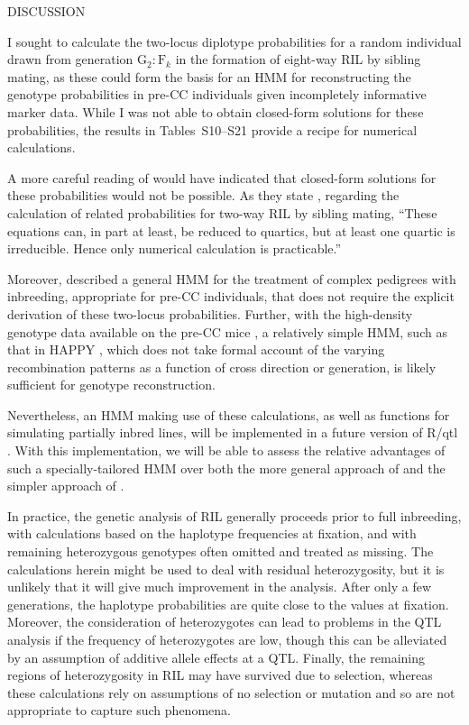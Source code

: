 \documentclass[12pt,letterpaper]{article}
\begin{document}
\clearpage
\centerline{DISCUSSION}


I sought to calculate the two-locus diplotype probabilities for a
random individual drawn from generation $\text{G}_2:\text{F}_k$ in the
formation of eight-way RIL by sibling mating, as these could form the
basis for an HMM for reconstructing the 
genotype probabilities in pre-CC individuals given incompletely
informative marker data.  While I was not able to obtain closed-form
solutions for these probabilities, the results in Tables~S10--S21
provide a recipe for numerical calculations.  


A more careful reading of \citet{Haldane1931} would have indicated
that closed-form solutions for these probabilities would not be
possible.  As they state \citep[p. 367]{Haldane1931}, regarding the
calculation of related probabilities for two-way RIL by sibling
mating, ``These equations can, in part at least, be reduced to
quartics, but at least one quartic is irreducible.  Hence only
numerical calculation is practicable.''

Moreover, \citet{Liu2010} described a general HMM for the treatment of complex
pedigrees with inbreeding, appropriate for pre-CC individuals, that
does not require the explicit derivation of these two-locus
probabilities.  Further, with the high-density genotype data
available on the pre-CC mice \citep{Aylor2011}, a relatively simple
HMM, such as that in HAPPY \citep{Mott2000}, which does not take
formal account of the varying recombination patterns as a function of
cross direction or generation, is likely sufficient for genotype
reconstruction.

Nevertheless, an HMM making use of these calculations, as well as
functions for simulating partially inbred lines, will be implemented
in a future version of R/qtl \citep{Broman2003}.  With this
implementation, we will be able to assess the relative advantages of such
a specially-tailored HMM over both the more general approach of
\citet{Liu2010} and the simpler approach of \citet{Mott2000}.

In practice, the genetic analysis of RIL generally proceeds prior to
full inbreeding, with calculations based on the haplotype
frequencies at fixation, and with remaining heterozygous genotypes
often omitted and treated as missing.  The calculations herein might
be used to deal with residual heterozygosity, but it is unlikely that
it will give much improvement in the analysis.  After only a few
generations, the haplotype probabilities are quite close to the values
at fixation.  Moreover, the consideration of heterozygotes can lead to
problems in the QTL analysis if the frequency of heterozygotes are
low, though this can be alleviated by an assumption of additive allele
effects at a QTL.  Finally, the remaining regions of heterozygosity in
RIL may have survived due to selection, whereas these calculations rely on 
assumptions of no selection or mutation and so are not appropriate to
capture such phenomena.
\end{document}
